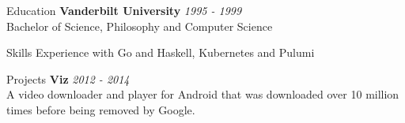 \documentclass{resume} %
\begin{document}
\begin{rSection}{Education}
{\bf Vanderbilt University} \hfill {\em 1995 - 1999}
\\ Bachelor of Science, Philosophy and Computer Science
\end{rSection}


\begin{rSection}{Skills}
Experience with Go and Haskell, Kubernetes and Pulumi
\end{rSection}

\begin{rSection}{Projects}
	{\bf Viz} \hfill {\em 2012 - 2014}
\\ A video downloader and player for Android that was downloaded over 10 million times before being removed by Google.
\end{rSection}
\end{document}
